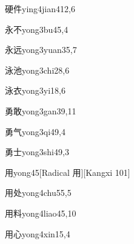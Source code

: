 \begin{verbete}{硬件}{ying4jian4}{12,6}
\end{verbete}

\begin{verbete}{永不}{yong3bu4}{5,4}
\end{verbete}

\begin{verbete}{永远}{yong3yuan3}{5,7}
\end{verbete}

\begin{verbete}{泳池}{yong3chi2}{8,6}
\end{verbete}

\begin{verbete}{泳衣}{yong3yi1}{8,6}
\end{verbete}

\begin{verbete}{勇敢}{yong3gan3}{9,11}
\end{verbete}

\begin{verbete}{勇气}{yong3qi4}{9,4}
\end{verbete}

\begin{verbete}{勇士}{yong3shi4}{9,3}
\end{verbete}

\begin{verbete}{用}{yong4}{5}[Radical 用][Kangxi 101]
\end{verbete}

\begin{verbete}{用处}{yong4chu5}{5,5}
\end{verbete}

\begin{verbete}{用料}{yong4liao4}{5,10}
\end{verbete}

\begin{verbete}{用心}{yong4xin1}{5,4}
\end{verbete}

